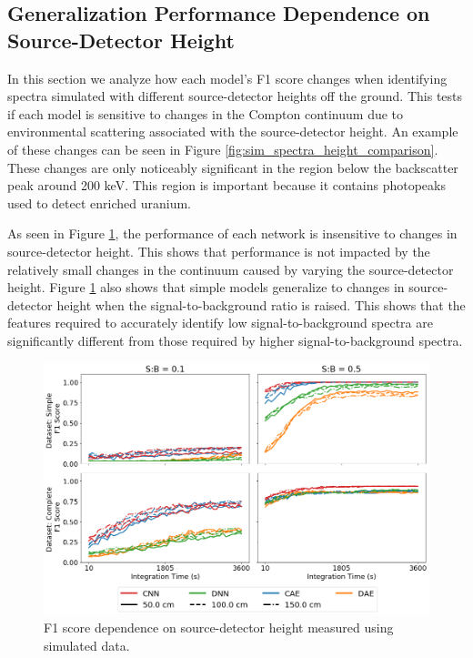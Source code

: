\subsection{Generalization Performance Dependence on Source-Detector Height}

In this section we analyze how each model's F1 score changes when identifying spectra simulated with different source-detector heights off the ground. This tests if each model is sensitive to changes in the Compton continuum due to environmental scattering associated with the source-detector height. An example of these changes can be seen in Figure \ref{fig:sim_spectra_height_comparison}. These changes are only noticeably significant in the region below the backscatter peak around 200 keV. This region is important because it contains photopeaks used to detect enriched uranium.

As seen in Figure \ref{fig:sim-generalization-height}, the performance of each network is insensitive to changes in source-detector height. This shows that performance is not impacted by the relatively small changes in the continuum caused by varying the source-detector height. Figure \ref{fig:sim-generalization-height} also shows that simple models generalize to changes in source-detector height when the signal-to-background ratio is raised. This shows that the features required to accurately identify low signal-to-background spectra are significantly different from those required by higher signal-to-background spectra. 


\begin{figure}[H]
	\centering
	\includegraphics[width=1.0\linewidth]{images/sim-generalization-height}
	\caption{F1 score dependence on source-detector height measured using simulated data.}
	\label{fig:sim-generalization-height}
\end{figure}


